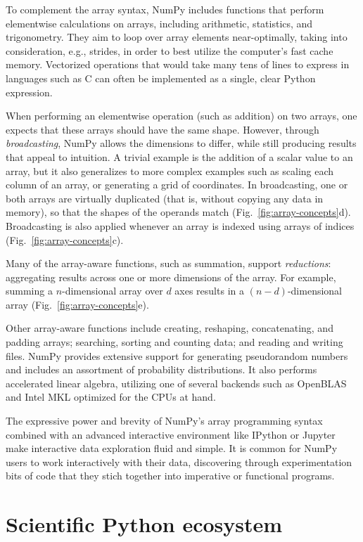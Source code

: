 To complement the array syntax, NumPy includes functions that perform
elementwise calculations on arrays, including arithmetic, statistics, and
trigonometry.
They aim to loop over array elements near-optimally, taking into consideration,
e.g., strides, in order to best utilize the computer's fast cache memory.
Vectorized operations that would take many tens of lines to express in
languages such as C can often be implemented as a single, clear Python
expression.

When performing an elementwise operation (such as addition) on two arrays, one
expects that these arrays should have the same shape.
However, through \emph{broadcasting}, NumPy allows the dimensions to differ, while
still producing results that appeal to intuition.
A trivial example is the addition of a scalar value to an array, but it also
generalizes to more complex examples such as scaling each column of an array,
or generating a grid of coordinates.
In broadcasting, one or both arrays are virtually duplicated (that is, without
copying any data in memory), so that the shapes of the operands match
(Fig.~\ref{fig:array-concepts}d).
Broadcasting is also applied whenever an array is indexed using arrays of
indices (Fig.~\ref{fig:array-concepts}c).

Many of the array-aware functions, such as summation, support \emph{reductions}: aggregating
results across one or more dimensions of the array.
For example, summing a $n$-dimensional array over $d$ axes results in a
$(n-d)$-dimensional array (Fig.~\ref{fig:array-concepts}e).

Other array-aware functions include creating, reshaping, concatenating, and padding
arrays; searching, sorting and counting data; and reading and writing files.
NumPy provides extensive support for generating pseudorandom numbers and
includes an assortment of probability distributions.
It also performs accelerated linear algebra, utilizing one of several backends
such as OpenBLAS \cite{wang2013augem,xianyi2012model} and Intel MKL optimized for the CPUs at hand.

The expressive power and brevity of NumPy's array programming syntax combined with 
an advanced interactive environment like IPython \cite{perez2007ipython}
or Jupyter \cite{Kluyver:2016aa} make interactive data exploration fluid and simple.
It is common for NumPy users to work interactively with their data,
discovering through experimentation bits of code that they stich together into
imperative or functional programs.

\section*{Scientific Python ecosystem}


